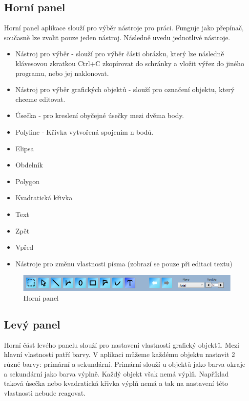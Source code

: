 \documentclass[
  field=inf,
  biblatex,
  glossaries,
  index
]{kidiplom}
\begin{document}
\subsection{Horní panel}
Horní panel aplikace slouží pro výběr nástroje pro práci. Funguje jako přepínač, současně lze zvolit pouze jeden nástroj. Následně uvedu jednotlivé nástroje.

\begin{itemize}
\item Nástroj pro výběr - slouží pro výběr části obrázku, který lze následně klávesovou zkratkou Ctrl+C zkopírovat do schránky a vložit výřez do jiného programu, nebo jej naklonovat.
\item Nástroj pro výběr grafických objektů - slouží pro označení objektu, který chceme editovat.
\item Úsečka - pro kreslení obyčejné úsečky mezi dvěma body.
\item Polyline - Křivka vytvořená spojením n bodů.
\item Elipsa
\item Obdelník
\item Polygon
\item Kvadratická křivka
\item Text
\item Zpět
\item Vpřed
\item Nástroje pro změnu vlastnosti písma (zobrazí se pouze při editaci textu)
\end{itemize}
\newpage
\begin{figure}
\includegraphics[width=16cm]{img/toppanel}
\caption{Horní panel}
\end{figure}


\subsection{Levý panel}

Horní část levého panelu slouží pro nastavení vlastností grafický objektů. Mezi hlavní vlastnosti patří barvy. V aplikaci můžeme každému objektu nastavit 2 různé barvy: primární a sekundární. Primární slouží u objektů jako barva okraje a sekundární jako barva výplně. Každý objekt však nemá výplň. Například taková úsečka nebo kvadratická křivka výplň nemá a tak na nastavení této vlastnosti nebude reagovat. 
\end{document}
